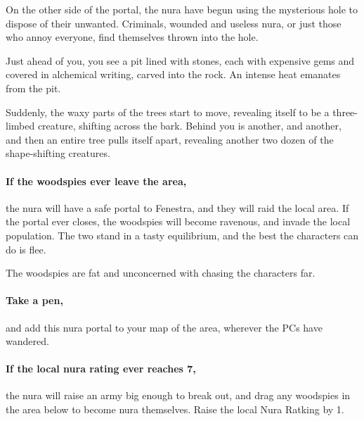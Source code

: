 \begin{multicols}{2}
On the other side of the portal, the nura have begun using the mysterious hole to dispose of their unwanted.
Criminals, wounded and useless nura, or just those who annoy everyone, find themselves thrown into the hole.

\begin{boxtext}

  Just ahead of you, you see a pit lined with stones, each with expensive gems and covered in alchemical writing, carved into the rock.
  An intense heat emanates from the pit.

  Suddenly, the waxy parts of the trees start to move, revealing itself to be a three-limbed creature, shifting across the bark.
  Behind you is another, and another, and then an entire tree pulls itself apart, revealing another two dozen of the shape-shifting creatures.

\end{boxtext}

\paragraph{If the woodspies ever leave the area,}
the nura will have a safe portal to Fenestra, and they will raid the local area.
If the portal ever closes, the woodspies will become ravenous, and invade the local population.
The two stand in a tasty equilibrium, and the best the characters can do is flee.

The woodspies are fat and unconcerned with chasing the characters far.


\paragraph{Take a pen,}
and add this nura portal to your map of the area, wherever the PCs have wandered.

\paragraph{If the local nura rating ever reaches 7,}
the nura will raise an army big enough to break out, and drag any woodspies in the area below to become nura themselves.
Raise the local Nura Ratking by 1.


\stopcontents[sq]

\end{multicols}

\stopcontents[Forest]

